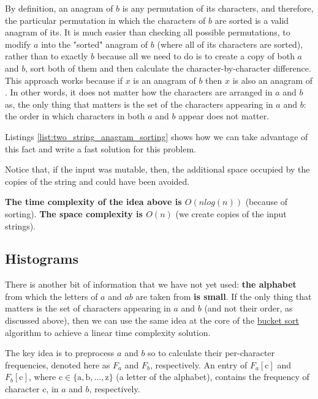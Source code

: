 By definition, an anagram of $b$ is any permutation of its characters, and therefore, the particular permutation in which the characters of $b$ are sorted is a valid anagram of its. 
It is much easier than checking all possible permutations, to modify $a$ into the "sorted" anagram of $b$ (where all of its characters are sorted), rather than to exactly $b$ because all we need to do is to create a copy of both $a$ and $b$, sort both of them and then calculate the character-by-character difference.
\textit{}This approach works because if $x$ is an anagram of $b$ then $x$ is also an
anagram of \textit{}. In other words, it does not matter how the characters are arranged in $a$ and $b$ as, the only thing that matters is the set of the characters
appearing in $a$ and $b$: the order in which characters in both $a$ and $b$ appear does not matter. 

Listings \ref{list:two_string_anagram_sorting}  shows how we can take advantage of this fact and write a fast solution for this problem.

 	

Notice that, if the input was mutable, then, the additional space occupied by the copies of the string  and 
could have been avoided. 
	 
\textbf{The time complexity of the idea above is $O(n log(n))$} (because of sorting). \textbf{The space complexity is $O(n)$} (we create copies of the input strings).
	 
		  

\subsection{Histograms}
\label{sec:anagrams:histograms}

There is another bit of information that we have not  yet used: \textbf{the alphabet} from which the
letters of $a$ and $ab$ are taken from \textbf{is small}. 
If the only thing that matters is the set of characters appearing in $a$ and $b$ (and not their order, as discussed above),
then we can use the same idea at the core of the \href{https://en.wikipedia.org/wiki/Bucket_sort}{bucket sort} algorithm to achieve a linear time complexity solution.

The key idea is to preprocess $a$ and $b$ so to calculate their per-character frequencies, denoted here as $F_a$ and $F_b$, respectively. An entry of $F_a[\mathrm{c}]$ and $F_b[\mathrm{c}]$, where $\mathrm{c} \in \{\mathrm{a},\mathrm{b},\ldots,\mathrm{z}\}$ (a letter of the alphabet), contains the frequency of character $\mathrm{c}$, in $a$ and $b$, respectively.

